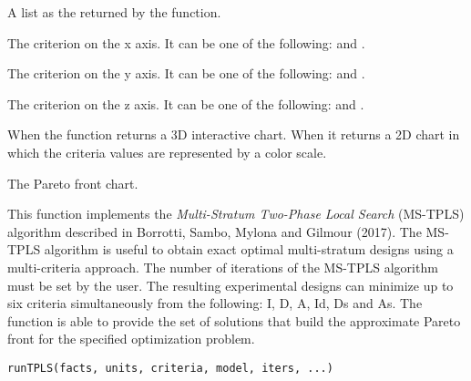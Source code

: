 \documentclass[a4paper]{book}
\begin{document}
%
\begin{Arguments}
\begin{ldescription}
\item[\code{ar}] A list as the  returned by the  function.

\item[\code{x}] The criterion on the x axis. It can be one of the following:  and .

\item[\code{y}] The criterion on the y axis. It can be one of the following:  and .

\item[\code{z}] The criterion on the z axis. It can be one of the following:  and .

\item[\code{mode}] When  the function returns a 3D interactive
chart. When  it returns a 2D chart in which the  criteria
values are represented by a color scale.
\end{ldescription}
\end{Arguments}
%
\begin{Value}
The Pareto front chart.
\end{Value}
%
\begin{Description}\relax
This function implements the \emph{Multi-Stratum Two-Phase Local
Search} (MS-TPLS) algorithm described in Borrotti, Sambo, Mylona and Gilmour
(2017). The MS-TPLS algorithm is useful to obtain exact optimal multi-stratum
designs using a multi-criteria approach. The number of iterations of the MS-TPLS
algorithm must be set by the user. The resulting experimental designs can minimize up
to six criteria simultaneously from the following: I, D, A, Id, Ds and As. The
 function is able to provide the set of solutions that build the
approximate Pareto front for the specified optimization problem.
\end{Description}
%
\begin{Usage}
\begin{verbatim}
runTPLS(facts, units, criteria, model, iters, ...)
\end{verbatim}
\end{Usage}
%
\end{document}

